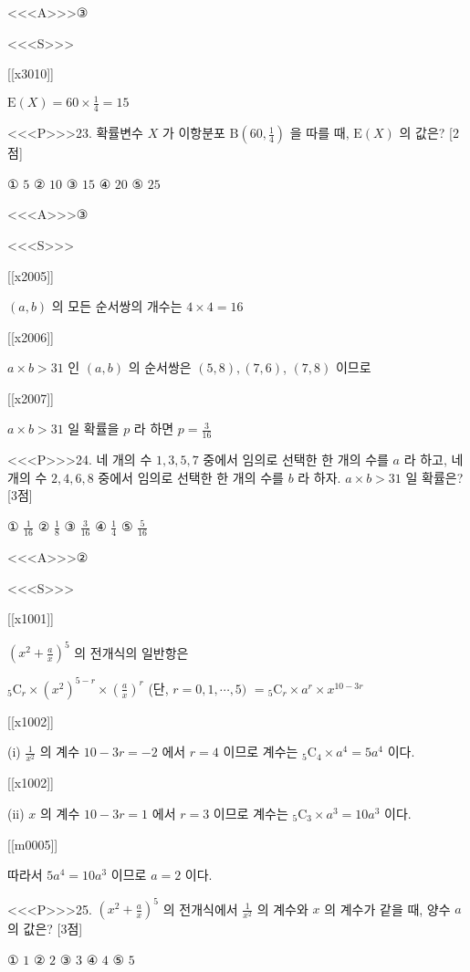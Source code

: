\documentclass{oblivoir}
\begin{document}
<<<A>>>③

<<<S>>>

[[x3010]]

$\mathrm{E}(X)=60 \times \frac{1}{4}=15$


<<<P>>>23. 확률변수 $X$ 가 이항분포 $\mathrm{B}\left(60, \frac{1}{4}\right)$ 을 따를 때, $\mathrm{E}(X)$ 의 값은? [2점]

① $5$
② $10$
③ $15$
④ $20$
⑤ $25$

<<<A>>>③

<<<S>>>

[[x2005]]

$(a, b)$ 의 모든 순서쌍의 개수는 $4 \times 4=16$

[[x2006]]

$a \times b>31$ 인 $(a, b)$ 의 순서쌍은 $(5,8),(7,6)$,
$(7,8)$ 이므로

[[x2007]]

$a \times b>31$ 일 확률을 $p$ 라 하면
$p=\frac{3}{16}$


<<<P>>>24. 네 개의 수 $1,3,5,7$ 중에서 임의로 선택한 한 개의 수를 $a$ 라 하고, 네 개의 수 $2,4,6,8$ 중에서 임의로 선택한 한 개의 수를 $b$ 라 하자. $a \times b>31$ 일 확률은? [3점]

① $\frac{1}{16}$
② $\frac{1}{8}$
③ $\frac{3}{16}$
④ $\frac{1}{4}$
⑤ $\frac{5}{16}$

<<<A>>>②

<<<S>>>

[[x1001]]

$\left(x^{2}+\frac{a}{x}\right)^{5}$ 의 전개식의 일반항은


${ }_{5} \mathrm{C}_{r} \times\left(x^{2}\right)^{5-r} \times\left(\frac{a}{x}\right)^{r}$ (단, $r=0,1, \cdots, 5)$
$={ }_{5} \mathrm{C}_{r} \times a^{r} \times x^{10-3 r}$

[[x1002]]

(i) $\frac{1}{x^{2}}$ 의 계수
$10-3 r=-2$ 에서 $r=4$ 이므로
계수는 ${ }_{5} \mathrm{C}_{4} \times a^{4}=5 a^{4}$ 이다.

[[x1002]]

(ii) $x$ 의 계수
$10-3 r=1$ 에서 $r=3$ 이므로
계수는 ${ }_{5} \mathrm{C}_{3} \times a^{3}=10 a^{3}$ 이다.

[[m0005]]

따라서 $5 a^{4}=10 a^{3}$ 이므로 $a=2$ 이다.


<<<P>>>25. $\left(x^{2}+\frac{a}{x}\right)^{5}$ 의 전개식에서 $\frac{1}{x^{2}}$ 의 계수와 $x$ 의 계수가 같을 때, 양수 $a$ 의 값은? [3점]

① $1$
② $2$
③ $3$
④ $4$
⑤ $5$
\end{document}
